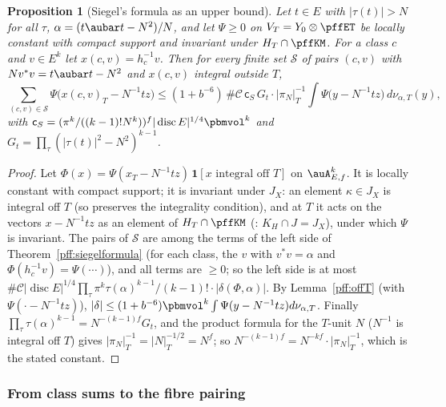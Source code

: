 \documentclass[10pt]{amsart}
\newtheorem{proposition}[theorem]{Proposition}
\theoremstyle{definition}
\theoremstyle{remark}
\begin{document}
\begin{proposition}[Siegel's formula as an upper bound]\label{pff:siegelsum}
Let $t\in E$ with $|\tau(t)|>N$ for all $\tau$, $\alpha=(t\aubar t-N^2)/N$, and let $\Psi\ge0$ on
$V_T=Y_0\otimes\pffET$ be locally constant with compact support and invariant under $H_T\cap\pffKM$.
For a class $c$ and $v\in E^k$ let $x(c,v)=h_c^{-1}v$. Then for every finite set $\mathcal S$ of pairs
$(c,v)$ with $Nv^*v=t\aubar t-N^2$ and $x(c,v)$ integral outside $T$,
\[
\sum_{(c,v)\in\mathcal S}\Psi\bigl(x(c,v)_T-N^{-1}tz\bigr)\le(1+b^{-6})\,\#\mathcal C\,\mathsf c_S\,G_t\cdot
|\pi_N|_T^{-1}\int\Psi\bigl(y-N^{-1}tz\bigr)\,d\nu_{\alpha,T}(y),
\]
with $\mathsf c_S=(\pi^k/((k-1)!N^k))^f|\operatorname{disc}E|^{1/4}\pbmvol^k$ and $G_t=\prod_\tau(|\tau(t)|^2-
N^2)^{k-1}$.
\end{proposition}
\begin{proof}
Let $\Phi(x)=\Psi(x_T-N^{-1}tz)\,\mathbf 1[x\text{ integral off }T]$ on $\auA_{E,f}^k$. It is locally
constant with compact support; it is invariant under $J_X$: an element $\kappa\in J_X$ is integral off $T$
(so preserves the integrality condition), and at $T$ it acts on the vectors $x-N^{-1}tz$ as an element of
$H_T\cap\pffKM$ ({\cite[Lemma~2.1]{P51}}: $K_H\cap J=J_X$), under which $\Psi$ is invariant. The pairs of
$\mathcal S$ are among the terms of the left side of Theorem~\ref{pff:siegelformula} (for each class, the
$v$ with $v^*v=\alpha$ and $\Phi(h_c^{-1}v)=\Psi(\cdots)$), and all terms are $\ge0$; so the left side is at
most $\#\mathcal C|\operatorname{disc}E|^{1/4}\prod_\tau\pi^k\tau(\alpha)^{k-1}/(k-1)!\cdot|\delta(\Phi,\alpha)|$.
By Lemma~\ref{pff:offT} (with $\Psi(\cdot-N^{-1}tz)$), $|\delta|\le(1+b^{-6})\pbmvol^k\int\Psi(y-N^{-1}tz)
d\nu_{\alpha,T}$. Finally $\prod_\tau\tau(\alpha)^{k-1}=N^{-(k-1)f}G_t$, and the product formula for the
$T$-unit $N$ ($N^{-1}$ is integral off $T$) gives $|\pi_N|_T^{-1}=|N|_T^{-1/2}=N^f$; so
$N^{-(k-1)f}=N^{-kf}\cdot|\pi_N|_T^{-1}$, which is the stated constant.
\end{proof}

\subsubsection*{From class sums to the fibre pairing}
\end{document}
